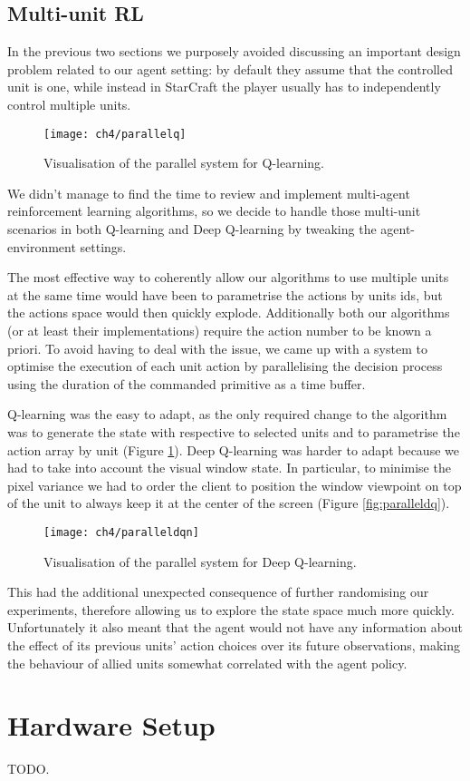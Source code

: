 \subsection{Multi-unit RL}

In the previous two sections we purposely avoided discussing an important design
problem related to our agent setting: by default they assume that the controlled
unit is one, while instead in StarCraft the player usually has to independently
control multiple units.

\begin{figure}[h]
    \centering
    \texttt{[image: ch4/parallelq]}
    \caption{Visualisation of the parallel system for Q-learning.}
    \label{fig:parallelq}
\end{figure}

We didn't manage to find the time to review and implement multi-agent
reinforcement learning algorithms, so we decide to handle those multi-unit
scenarios in both Q-learning and Deep Q-learning by tweaking the
agent-environment settings.

The most effective way to coherently allow our algorithms to use multiple units
at the same time would have been to parametrise the actions by units ids, but
the actions space would then quickly explode. Additionally both our algorithms
(or at least their implementations) require the action number to be known a
priori. To avoid having to deal with the issue, we came up with a system to
optimise the execution of each unit action by parallelising the decision process
using the duration of the commanded primitive as a time buffer.

Q-learning was the easy to adapt, as the only required change to the algorithm
was to generate the state with respective to selected units and to parametrise
the action array by unit (Figure \ref{fig:parallelq}). Deep Q-learning was
harder to adapt because we had to take into account the visual window state. In
particular, to minimise the pixel variance we had to order the client to
position the window viewpoint on top of the unit to always keep it at the center
of the screen (Figure \ref{fig:paralleldq}).

\begin{figure}[h]
    \centering
    \texttt{[image: ch4/paralleldqn]}
    \caption{Visualisation of the parallel system for Deep Q-learning.}
    \label{fig:paralleldqn}
\end{figure}

This had the additional unexpected consequence of further randomising our
experiments, therefore allowing us to explore the state space much more quickly.
Unfortunately it also meant that the agent would not have any information about
the effect of its previous units' action choices over its future observations,
making the behaviour of allied units somewhat correlated with the agent policy.


\section{Hardware Setup}

TODO.